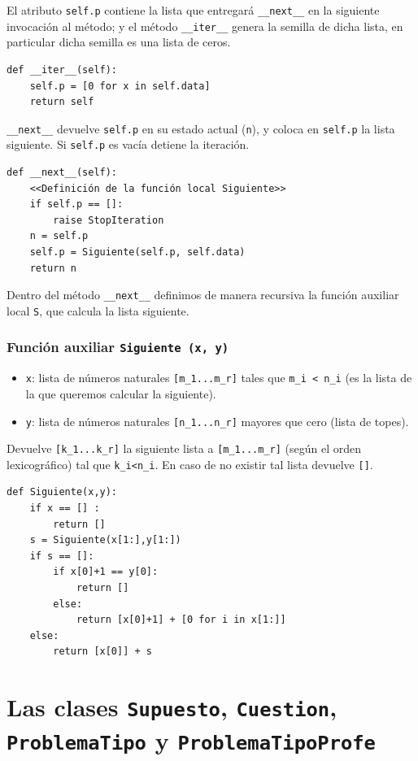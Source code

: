 \documentclass[10pt,a4paper]{report}
\begin{document}
El atributo \texttt{self.p} contiene la lista que entregará \texttt{\_\_next\_\_} en la siguiente invocación al método; y el método \texttt{\_\_iter\_\_} genera la semilla de dicha lista, en particular dicha semilla es una lista de ceros.
\begin{verbatim}
def __iter__(self):
    self.p = [0 for x in self.data]
    return self
\end{verbatim}

\texttt{\_\_next\_\_} devuelve \texttt{self.p} en su estado actual (\texttt{n}), y coloca en \texttt{self.p} la lista siguiente. Si \texttt{self.p} es vacía detiene la iteración.
\begin{verbatim}
def __next__(self):
    <<Definición de la función local Siguiente>>
    if self.p == []:
        raise StopIteration
    n = self.p
    self.p = Siguiente(self.p, self.data)
    return n
\end{verbatim}

Dentro del método \texttt{\_\_next\_\_} definimos de manera recursiva la función auxiliar local \texttt{S}, que calcula la lista siguiente.
\subsection{Función auxiliar \texttt{Siguiente (x, y)}}
\label{sec:orge0b9b23}

\begin{itemize}
\item \texttt{x}: lista de números naturales \texttt{[m\_1...m\_r]} tales   que \texttt{m\_i < n\_i} (es la lista de la que queremos calcular la siguiente).
\item \texttt{y}: lista de números naturales \texttt{[n\_1...n\_r]} mayores que cero (lista de topes).
\end{itemize}
Devuelve \texttt{[k\_1...k\_r]} la siguiente lista a \texttt{[m\_1...m\_r]} (según el orden lexicográfico) tal que \texttt{k\_i<n\_i}.
En caso de no existir tal lista devuelve \texttt{[]}.
\begin{verbatim}
def Siguiente(x,y):
    if x == [] :
        return []
    s = Siguiente(x[1:],y[1:])
    if s == []:
        if x[0]+1 == y[0]:
            return []
        else:
            return [x[0]+1] + [0 for i in x[1:]]
    else:
        return [x[0]] + s
\end{verbatim}
\chapter{Las clases \texttt{Supuesto}, \texttt{Cuestion}, \texttt{ProblemaTipo} y \texttt{ProblemaTipoProfe}}
\label{sec:orgf395732}
\end{document}

